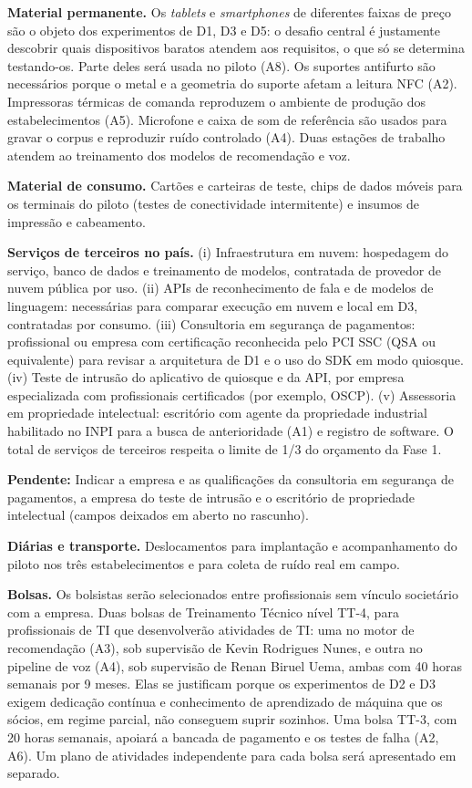 \documentclass[12pt,a4paper]{article}
\newcommand{\pendente}[1]{\begin{pendbox}\textbf{\color{pendfg}Pendente:} #1\end{pendbox}}
\begin{document}
\textbf{Material permanente.} Os \textit{tablets} e \textit{smartphones} de diferentes faixas de preço são o objeto dos experimentos de D1, D3 e D5: o desafio central é justamente descobrir quais dispositivos baratos atendem aos requisitos, o que só se determina testando-os. Parte deles será usada no piloto (A8). Os suportes antifurto são necessários porque o metal e a geometria do suporte afetam a leitura NFC (A2). Impressoras térmicas de comanda reproduzem o ambiente de produção dos estabelecimentos (A5). Microfone e caixa de som de referência são usados para gravar o corpus e reproduzir ruído controlado (A4). Duas estações de trabalho atendem ao treinamento dos modelos de recomendação e voz.

\textbf{Material de consumo.} Cartões e carteiras de teste, chips de dados móveis para os terminais do piloto (testes de conectividade intermitente) e insumos de impressão e cabeamento.

\textbf{Serviços de terceiros no país.} (i) Infraestrutura em nuvem: hospedagem do serviço, banco de dados e treinamento de modelos, contratada de provedor de nuvem pública por uso. (ii) APIs de reconhecimento de fala e de modelos de linguagem: necessárias para comparar execução em nuvem e local em D3, contratadas por consumo. (iii) Consultoria em segurança de pagamentos: profissional ou empresa com certificação reconhecida pelo PCI SSC (QSA ou equivalente) para revisar a arquitetura de D1 e o uso do SDK em modo quiosque. (iv) Teste de intrusão do aplicativo de quiosque e da API, por empresa especializada com profissionais certificados (por exemplo, OSCP). (v) Assessoria em propriedade intelectual: escritório com agente da propriedade industrial habilitado no INPI para a busca de anterioridade (A1) e registro de software. O total de serviços de terceiros respeita o limite de 1/3 do orçamento da Fase 1.

\pendente{Indicar a empresa e as qualificações da consultoria em segurança de pagamentos, a empresa do teste de intrusão e o escritório de propriedade intelectual (campos deixados em aberto no rascunho).}

\textbf{Diárias e transporte.} Deslocamentos para implantação e acompanhamento do piloto nos três estabelecimentos e para coleta de ruído real em campo.

\textbf{Bolsas.} Os bolsistas serão selecionados entre profissionais sem vínculo societário com a empresa. Duas bolsas de Treinamento Técnico nível TT-4, para profissionais de TI que desenvolverão atividades de TI: uma no motor de recomendação (A3), sob supervisão de Kevin Rodrigues Nunes, e outra no pipeline de voz (A4), sob supervisão de Renan Biruel Uema, ambas com 40 horas semanais por 9 meses. Elas se justificam porque os experimentos de D2 e D3 exigem dedicação contínua e conhecimento de aprendizado de máquina que os sócios, em regime parcial, não conseguem suprir sozinhos. Uma bolsa TT-3, com 20 horas semanais, apoiará a bancada de pagamento e os testes de falha (A2, A6). Um plano de atividades independente para cada bolsa será apresentado em separado.
\end{document}
